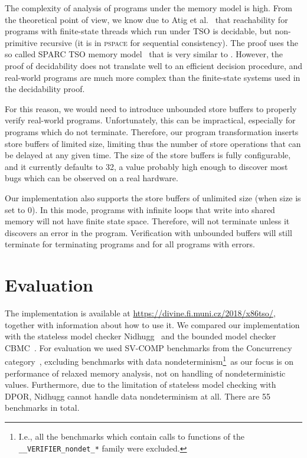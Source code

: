 The complexity of analysis of programs under the \xtso memory model is high.
From the theoretical point of view, we know due to Atig et al.~\cite{wmdecidability} that reachability for programs with finite-state threads which run under TSO is decidable, but non-primitive recursive (it is in \textsc{pspace} for sequential consistency).
The proof uses the so called SPARC TSO memory model~\cite{SPARC94} that is very similar to \xtso. However, the proof of decidability does not translate well to an efficient decision procedure, and real-world programs are much more complex than the finite-state systems used in the decidability proof.

For this reason, we would need to introduce unbounded store buffers to properly
verify real-world programs. Unfortunately, this can be impractical, especially for programs which do not terminate.
Therefore, our program transformation
inserts store buffers of limited size, limiting thus the number of store
operations that can be delayed at any given time. The
size of the store buffers is fully configurable, and it currently defaults to
32, a value probably high enough to discover most bugs which can be observed on
a real hardware.

Our implementation also supports the store buffers of unlimited
size (when size is set to 0). In this mode, programs with infinite loops that write into
shared memory will not have finite state space. Therefore, \divine will not
terminate unless it discovers an error in the program. Verification with
unbounded buffers will still terminate for terminating programs and for all
programs with errors.


\section{Evaluation} \label{sec:evaluation}

The implementation is available at \url{https://divine.fi.muni.cz/2018/x86tso/}, together with information about how to use it.
We compared our implementation with the stateless model checker Nidhugg~\cite{Abdulla2015} and the bounded model checker CBMC~\cite{Clarke2004,Kroening2014}.
For evaluation we used SV-COMP benchmarks from the Concurrency
category~\cite{SV-COMP:2017}, excluding benchmarks with data
nondeterminism\footnote{I.e., all the benchmarks which contain calls to
  functions of the \texttt{\_\_VERIFIER\_nondet\_*} family were excluded.}~as
our focus is on performance of relaxed memory analysis, not on handling of nondeterministic values.
Furthermore, due to the limitation of stateless model checking with DPOR,
Nidhugg cannot handle data nondeterminism at all. %
There are 55 benchmarks in total.

